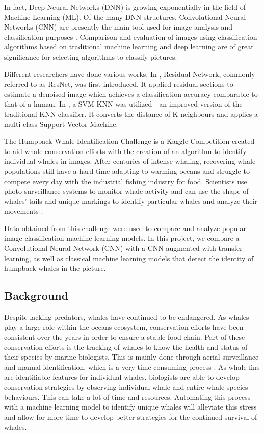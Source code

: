 \documentclass[paper=a4, fontsize=11pt]{scrartcl}
\numberwithin{equation}{section}		%
\numberwithin{table}{section}				%
\begin{document}
In fact, Deep Neural Networks (DNN) is growing exponentially in the field of Machine Learning (ML). Of the many DNN structures, Convolutional Neural Networks (CNN) are presently the main tool used for image analysis and classification purposes \cite{jain2000statistical}. Comparison and evaluation of images using classification algorithms based on traditional machine learning and deep learning are of great significance for selecting algorithms to classify pictures. 

Different researchers have done various works. In \cite{he2016deep}, Residual Network, commonly referred to as ResNet, was first introduced. It applied residual sections to estimate a denoised image which achieves a classification accuracy comparable to that of a human. In \cite{zhang2006svm}, a SVM KNN was utilized - an improved version of the traditional KNN classifier. It converts the distance of K neighbours and applies a multi-class Support Vector Machine. 

The Humpback Whale Identification Challenge is a Kaggle Competition created to aid whale conservation efforts with the creation of an algorithm to identify individual whales in images. After centuries of intense whaling, recovering whale populations still have a hard time adapting to warming oceans and struggle to compete every day with the industrial fishing industry for food. Scientists use photo surveillance systems to monitor whale activity and can use the shape of whales’ tails and unique markings to identify particular whales and analyze their movements \cite{JaisakthiS.M.2017Awms}.

Data obtained from this challenge were used to compare and analyze popular image classification machine learning models. In this project, we compare a Convolutional Neural Network (CNN) with a CNN augmented with transfer learning, as well as classical machine learning models that detect the identity of humpback whales in the picture.


\subsection{Background}\label{sec: background}

Despite lacking predators, whales have continued to be endangered. As whales play a large role within the oceans ecosystem, conservation efforts have been consistent over the years in order to ensure a stable food chain. Part of these conservation efforts is the tracking of whales to know the health and status of their species by marine biologists. This is mainly done through aerial surveillance and manual identification, which is a very time consuming process \cite{JaisakthiS.M.2017Awms}. As whale fins are identifiable features for individual whales, biologists are able to develop conservation strategies by observing individual whale and entire whale species behaviours. This can take a lot of time and resources. Automating this process with a machine learning model to identify unique whales will alleviate this stress and allow for more time to develop better strategies for the continued survival of whales.
\end{document}
